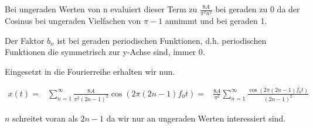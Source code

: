 \documentclass{article}
\begin{document}
    Bei ungeraden Werten von n evaluiert dieser Term zu $\frac{8A}{\pi^2 n^2}$ bei geraden zu $0$ da der Cosinus bei ungeraden Vielfachen von $\pi -1$ annimmt und bei geraden 1. 


    Der Faktor $b_n$ ist bei geraden periodischen Funktionen, d.h. periodischen Funktionen die symmetrisch zur y-Achse sind, immer 0.
    
    Eingesetzt in die Fourierreihe erhalten wir nun.

    \begin{eqnarray*}
        x(t) = &  \sum_{n=1}^\infty \frac{8A}{\pi^2 (2n-1)^2}\cos(2\pi (2n-1) f_0 t)
        =& \frac{8A}{\pi^2}\sum_{n=1}^\infty\frac{\cos(2\pi (2n-1) f_0 t)}{(2n-1)^2}
    \end{eqnarray*}

    $n$ schreitet voran als $2n-1$ da wir nur an ungeraden Werten interessiert sind.

    
\end{document}
